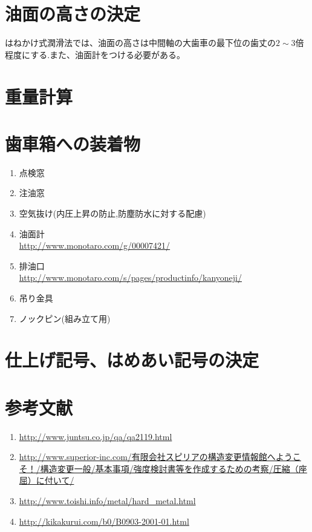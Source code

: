 \section{油面の高さの決定}
はねかけ式潤滑法では、油面の高さは中間軸の大歯車の最下位の歯丈の$2\sim3$倍程度にする.また、油面計をつける必要がある。
\section{重量計算}

\section{歯車箱への装着物}
\begin{enumerate}
\item 点検窓
\item 注油窓
\item 空気抜け(内圧上昇の防止,防塵防水に対する配慮)
\item 油面計\\
\url{http://www.monotaro.com/g/00007421/}
\item 排油口\\
\url{http://www.monotaro.com/s/pages/productinfo/kanyoneji/}
\item 吊り金具
\item ノックピン(組み立て用)
\end{enumerate}
\section{仕上げ記号、はめあい記号の決定}

\section{参考文献}
\begin{enumerate}
\item \url{http://www.juntsu.co.jp/qa/qa2119.html}
\item \url{http://www.superior-inc.com/有限会社スピリアの構造変更情報館へようこそ！/構造変更一般/基本事項/強度検討書等を作成するための考察/圧縮（座屈）に付いて/}
\item \url{http://www.toishi.info/metal/hard_metal.html}
\item \url{http://kikakurui.com/b0/B0903-2001-01.html}
\end{enumerate}
